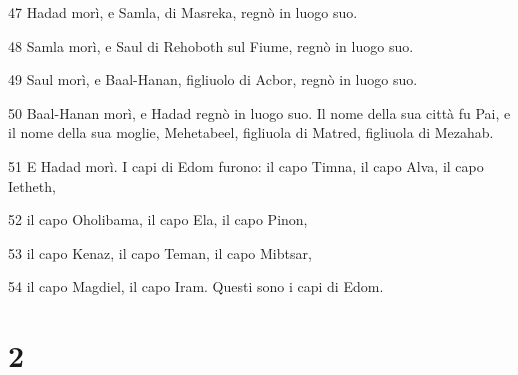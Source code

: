 \par 47 Hadad morì, e Samla, di Masreka, regnò in luogo suo.
\par 48 Samla morì, e Saul di Rehoboth sul Fiume, regnò in luogo suo.
\par 49 Saul morì, e Baal-Hanan, figliuolo di Acbor, regnò in luogo suo.
\par 50 Baal-Hanan morì, e Hadad regnò in luogo suo. Il nome della sua città fu Pai, e il nome della sua moglie, Mehetabeel, figliuola di Matred, figliuola di Mezahab.
\par 51 E Hadad morì. I capi di Edom furono: il capo Timna, il capo Alva, il capo Ietheth,
\par 52 il capo Oholibama, il capo Ela, il capo Pinon,
\par 53 il capo Kenaz, il capo Teman, il capo Mibtsar,
\par 54 il capo Magdiel, il capo Iram. Questi sono i capi di Edom.

\chapter{2}

